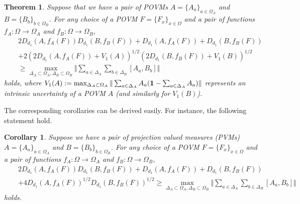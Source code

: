 \documentclass[showpacs,preprintnumbers,amsmath,amssymb]{revtex4}
\newtheorem{theorem}{Theorem}
\newtheorem{corollary}{Corollary}
\begin{document}
\begin{theorem}
Suppose that we have a pair of POVMs $A=\{A_a\}_{a\in \Omega_A}$ 
and $B=\{B_b\}_{b\in \Omega_B}$. For any choice of a POVM 
$F=\{F_x\}_{x\in \Omega}$ and a pair of functions 
$f_A: \Omega \to \Omega_A$ and $f_B: \Omega \to \Omega_B$, 
\begin{eqnarray*}
&&2 D_{d_{1}}(A, f_A(F))D_{d_{1}}(B, f_B(F))
+D_{d_{1}}(A,f_A(F))+D_{d_{1}}(B,f_B(F))
\\
&&
+2 (2D_{d_{1}}(A,f_A(F))+ V_1(A))^{1/2}(2D_{d_{1}}(B,f_B(F))
+V_1(B))^{1/2}
\\
&&
\geq \max_{\Delta_A \subset 
\Omega_A, \Delta_B\subset \Omega_B}\Vert
\sum_{a\in \Delta_A}
\sum_{b \in \Delta_B} [A_a,B_b]\Vert
\end{eqnarray*}
holds, where $V_1(A):=\max_{\Delta_A\subset 
\Omega_A}\Vert \sum_{a\in \Delta_A}
A_a ({\bf 1}-\sum_{a\in \Delta_A} A_a)\Vert$ represents 
an intrinsic uncertainty of a POVM $A$ (and similarly for $V_1(B)$). 
\end{theorem}
The corresponding corollaries can be derived easily.
For instance, the following statement hold.
\begin{corollary}
Suppose we have a pair of projection valued measures (PVMs) 
$A=\{A_a\}_{a\in \Omega_A}$ and $B=\{B_b\}_{b \in \Omega_B}$. 
For any choice of a POVM 
$F=\{F_x\}_{x\in \Omega}$ and a pair of functions 
$f_A: \Omega \to \Omega_A$ and $f_B: \Omega \to \Omega_B$, 
\begin{eqnarray*}
&&2 D_{d_{1}}(A, f_A(F))D_{d_{1}}(B, f_B(F))
+D_{d_{1}}(A,f_A(F))+D_{d_{1}}(B,f_B(F))
\\
&&
+4 D_{d_{1}}(A,f_A(F))^{1/2}D_{d_{1}}(B,f_B(F))^{1/2}
\geq 
\max_{\Delta_A \subset 
\Omega_A, \Delta_B\subset \Omega_B}\Vert
\sum_{a\in \Delta_A}
\sum_{b \in \Delta_B} [A_a,B_b]\Vert
\end{eqnarray*}
holds.
\end{corollary}
%
\end{document}
